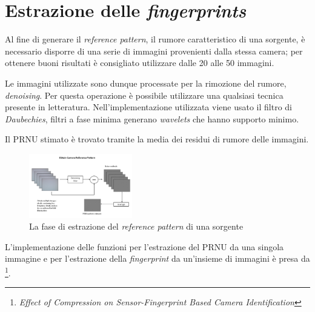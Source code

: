 \section{Estrazione delle \emph{fingerprints}}

Al fine di generare il \emph{reference pattern}, il rumore caratteristico di una sorgente, è necessario disporre di una serie di immagini provenienti dalla stessa camera; per ottenere buoni risultati è consigliato utilizzare dalle 20 alle 50 immagini.

Le immagini utilizzate sono dunque processate per la rimozione del rumore, \emph{denoising}. Per questa operazione è possibile utilizzare una qualsiasi tecnica presente in letteratura. Nell'implementazione utilizzata viene usato il filtro di \emph{Daubechies}\cite{Daubechies:1992:TLW:130655}, filtri a fase minima generano \emph{wavelets} che hanno supporto minimo. 

Il PRNU stimato è trovato tramite la media dei residui di rumore delle immagini. 

\begin{figure}[h]
\begin{center}
\includegraphics[width=0.4\textwidth]{images/prnu_extraction.jpg}
\end{center}
  \caption{La fase di estrazione del \emph{reference pattern} di una sorgente\cite{figprnu}}
\label{fig:extraction}
\end{figure}

L'implementazione delle funzioni per l'estrazione del PRNU da una singola immagine e per l'estrazione della \emph{fingerprint} da un'insieme di immagini è presa da \cite{goljan2016effect}\footnote{\emph{Effect of Compression on Sensor-Fingerprint Based Camera Identification}}.